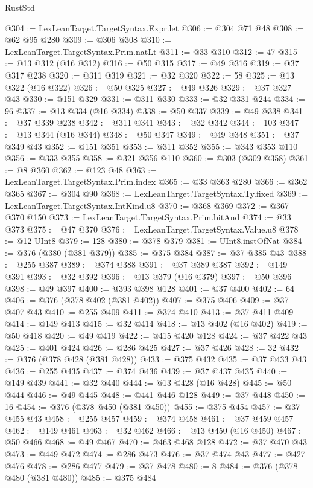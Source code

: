 \begin{lexlean}{RustStd}
\begin{coremodule}
{\begin{coremodule}
{{{{{{{{{{{{@304 := LexLeanTarget.TargetSyntax.Expr.let
@306 := @304 @71 @48
@308 := @62 @95 @280
@309 := @306 @308
@310 := LexLeanTarget.TargetSyntax.Prim.natLt
@311 := @33 @310
@312 := 47
@315 := @13 @312 (@16 @312)
@316 := @50 @315
@317 := @49 @316
@319 := @37 @317 @238
@320 := @311 @319
@321 := @32 @320
@322 := 58
@325 := @13 @322 (@16 @322)
@326 := @50 @325
@327 := @49 @326
@329 := @37 @327 @43
@330 := @151 @329
@331 := @311 @330
@333 := @32 @331 @244
@334 := 96
@337 := @13 @334 (@16 @334)
@338 := @50 @337
@339 := @49 @338
@341 := @37 @339 @238
@342 := @311 @341
@343 := @32 @342
@344 := 103
@347 := @13 @344 (@16 @344)
@348 := @50 @347
@349 := @49 @348
@351 := @37 @349 @43
@352 := @151 @351
@353 := @311 @352
@355 := @343 @353 @110
@356 := @333 @355
@358 := @321 @356 @110
@360 := @303 (@309 @358)
@361 := @8 @360
@362 := @123 @48
@363 := LexLeanTarget.TargetSyntax.Prim.index
@365 := @33 @363 @280
@366 := @362 @365
@367 := @304 @90
@368 := LexLeanTarget.TargetSyntax.Ty.fixed
@369 := LexLeanTarget.TargetSyntax.IntKind.u8
@370 := @368 @369
@372 := @367 @370 @150
@373 := LexLeanTarget.TargetSyntax.Prim.bitAnd
@374 := @33 @373
@375 := @47 @370
@376 := LexLeanTarget.TargetSyntax.Value.u8
@378 := @12 UInt8
@379 := 128
@380 := @378 @379
@381 := UInt8.instOfNat
@384 := @376 (@380 (@381 @379))
@385 := @375 @384
@387 := @37 @385 @43
@388 := @255 @387
@389 := @374 @388
@391 := @37 @389 @387
@392 := @149 @391
@393 := @32 @392
@396 := @13 @379 (@16 @379)
@397 := @50 @396
@398 := @49 @397
@400 := @393 @398 @128
@401 := @37 @400
@402 := 64
@406 := @376 (@378 @402 (@381 @402))
@407 := @375 @406
@409 := @37 @407 @43
@410 := @255 @409
@411 := @374 @410
@413 := @37 @411 @409
@414 := @149 @413
@415 := @32 @414
@418 := @13 @402 (@16 @402)
@419 := @50 @418
@420 := @49 @419
@422 := @415 @420 @128
@424 := @37 @422 @43
@425 := @401 @424
@426 := @286 @425
@427 := @37 @426
@428 := 32
@432 := @376 (@378 @428 (@381 @428))
@433 := @375 @432
@435 := @37 @433 @43
@436 := @255 @435
@437 := @374 @436
@439 := @37 @437 @435
@440 := @149 @439
@441 := @32 @440
@444 := @13 @428 (@16 @428)
@445 := @50 @444
@446 := @49 @445
@448 := @441 @446 @128
@449 := @37 @448
@450 := 16
@454 := @376 (@378 @450 (@381 @450))
@455 := @375 @454
@457 := @37 @455 @43
@458 := @255 @457
@459 := @374 @458
@461 := @37 @459 @457
@462 := @149 @461
@463 := @32 @462
@466 := @13 @450 (@16 @450)
@467 := @50 @466
@468 := @49 @467
@470 := @463 @468 @128
@472 := @37 @470 @43
@473 := @449 @472
@474 := @286 @473
@476 := @37 @474 @43
@477 := @427 @476
@478 := @286 @477
@479 := @37 @478
@480 := 8
@484 := @376 (@378 @480 (@381 @480))
@485 := @375 @484
}}}}}}}}}}}}
\end{coremodule}}
\end{coremodule}
\end{lexlean}
